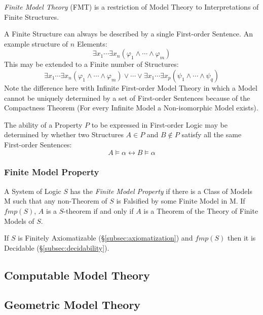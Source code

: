\documentclass{article}
\begin{document}
\emph{Finite Model Theory} (FMT) is a restriction of Model Theory to
Interpretations of Finite Structures.

A Finite Structure can always be described by a single First-order
Sentence. An example structure of $n$ Elements:
\[
    \exists x_1 \cdots \exists x_n ( \varphi_1 \wedge \cdots \wedge
    \varphi_m )
\]
This may be extended to a Finite number of Structures:
\[
    \exists x_1 \cdots \exists x_n ( \varphi_1 \wedge \cdots \wedge
    \varphi_m )
    \vee
    \cdots
    \vee
    \exists x_1 \cdots \exists x_p ( \psi_1 \wedge \cdots \wedge
    \psi_q )
\]
Note the difference here with Infinite First-order Model Theory in
which a Model cannot be uniquely determined by a set of First-order
Sentences because of the Compactness Theorem (For every Infinite Model
a Non-isomorphic Model exists).

The ability of a Property $P$ to be expressed in First-order Logic may
be determined by whether two Structures $A \in P$ and $B \notin P$
satisfy all the same First-order Sentences:
\[
    A \vDash \alpha \leftrightarrow B \vDash \alpha
\]

\subsubsection{Finite Model Property}

A System of Logic $S$ has the \emph{Finite Model Property} if there is
a Class of Models $\mathrm{M}$ such that any non-Theorem of $S$ is
Falsified by some Finite Model in $\mathrm{M}$. If $fmp(S)$, $A$ is a
$S$-theorem if and only if $A$ is a Theorem of the Theory of Finite
Models of $S$.

If $S$ is Finitely Axiomatizable (\S\ref{subsec:axiomatization}) and
$fmp(S)$ then it is Decidable (\S\ref{subsec:decidability}).

\subsection{Computable Model Theory}\label{subsec:computable_model_theory}

\cite{harizanov98}

\subsection{Geometric Model Theory}
\end{document}
